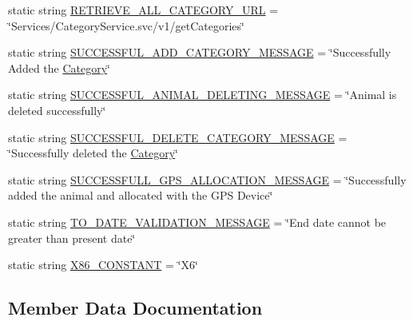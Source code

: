 \begin{DoxyCompactItemize}
\item 
static string \hyperlink{classWildlifeTrackingApp_1_1Utility_1_1Constants_a66a0208e68737d6c803afc8df55a04d1}{R\+E\+T\+R\+I\+E\+V\+E\+\_\+\+A\+L\+L\+\_\+\+C\+A\+T\+E\+G\+O\+R\+Y\+\_\+\+U\+RL} = \char`\"{}Services/Category\+Service.\+svc/v1/get\+Categories\char`\"{}
\item 
static string \hyperlink{classWildlifeTrackingApp_1_1Utility_1_1Constants_ab435d8d93e93bfe37f9969527966dfdf}{S\+U\+C\+C\+E\+S\+S\+F\+U\+L\+\_\+\+A\+D\+D\+\_\+\+C\+A\+T\+E\+G\+O\+R\+Y\+\_\+\+M\+E\+S\+S\+A\+GE} = \char`\"{}Successfully Added the \hyperlink{classWildlifeTrackingApp_1_1Category}{Category}\char`\"{}
\item 
static string \hyperlink{classWildlifeTrackingApp_1_1Utility_1_1Constants_a60b55ccb1b71163e8e94149114b40a3e}{S\+U\+C\+C\+E\+S\+S\+F\+U\+L\+\_\+\+A\+N\+I\+M\+A\+L\+\_\+\+D\+E\+L\+E\+T\+I\+N\+G\+\_\+\+M\+E\+S\+S\+A\+GE} = \char`\"{}Animal is deleted successfully\char`\"{}
\item 
static string \hyperlink{classWildlifeTrackingApp_1_1Utility_1_1Constants_a47b27471a06336a2eb79d2cd9dece230}{S\+U\+C\+C\+E\+S\+S\+F\+U\+L\+\_\+\+D\+E\+L\+E\+T\+E\+\_\+\+C\+A\+T\+E\+G\+O\+R\+Y\+\_\+\+M\+E\+S\+S\+A\+GE} = \char`\"{}Successfully deleted the \hyperlink{classWildlifeTrackingApp_1_1Category}{Category}\char`\"{}
\item 
static string \hyperlink{classWildlifeTrackingApp_1_1Utility_1_1Constants_ab7dec433f3af54f597bd520a55f39c9f}{S\+U\+C\+C\+E\+S\+S\+F\+U\+L\+L\+\_\+\+G\+P\+S\+\_\+\+A\+L\+L\+O\+C\+A\+T\+I\+O\+N\+\_\+\+M\+E\+S\+S\+A\+GE} = \char`\"{}Successfully added the animal and allocated with the G\+PS Device\char`\"{}
\item 
static string \hyperlink{classWildlifeTrackingApp_1_1Utility_1_1Constants_abaac5dc652e04ef9c20a970c7bcc5e59}{T\+O\+\_\+\+D\+A\+T\+E\+\_\+\+V\+A\+L\+I\+D\+A\+T\+I\+O\+N\+\_\+\+M\+E\+S\+S\+A\+GE} = \char`\"{}End date cannot be greater than present date\char`\"{}
\item 
static string \hyperlink{classWildlifeTrackingApp_1_1Utility_1_1Constants_acb342f6eb50039d8e87a136774d2bb43}{X86\+\_\+\+C\+O\+N\+S\+T\+A\+NT} = \char`\"{}X6\char`\"{}
\end{DoxyCompactItemize}


\subsection{Member Data Documentation}
\mbox{\label{classWildlifeTrackingApp_1_1Utility_1_1Constants_a123c1c5bb235a2e006300c385c8af3c4}} 
